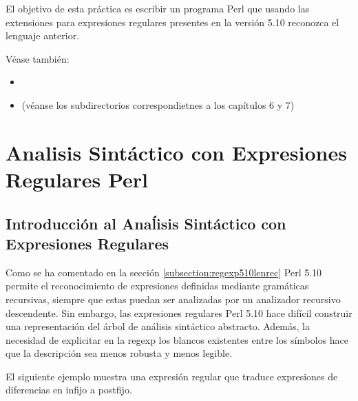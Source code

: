 El  objetivo de esta práctica es escribir un programa Perl
que usando las extensiones para expresiones regulares presentes 
en la versión 5.10 reconozca el lenguaje anterior.

Véase también:

\begin{itemize}
\item
{}
\item
{} (véanse los subdirectorios
correspondietnes a los capítulos 6 y 7)
\end{itemize}


\section{Analisis Sintáctico con Expresiones Regulares Perl}

\subsection{Introducción al Anaĺisis Sintáctico con Expresiones Regulares}

Como se ha comentado en la sección
\ref{subsection:regexp510lenrec}
Perl 5.10 permite el reconocimiento de expresiones
definidas mediante gramáticas recursivas, siempre que 
estas puedan ser analizadas por un analizador recursivo descendente.
Sin embargo, las expresiones regulares Perl 5.10 
hace difícil construir una representación 
del árbol de análisis sintáctico abstracto. Además, la necesidad
de explicitar en la regexp los blancos existentes entre los símbolos
hace que la descripción sea menos robusta y menos legible.


El siguiente ejemplo muestra una expresión regular
que traduce expresiones de diferencias en infijo
a postfijo.

